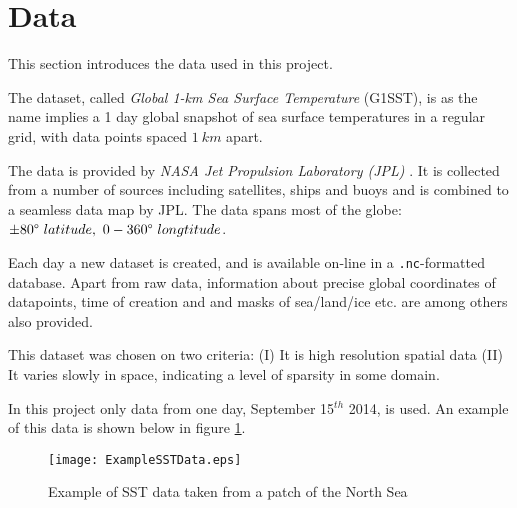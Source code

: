 \documentclass[Main]{subfiles}
\begin{document}
\section{Data} %
\label{sec:data}
	
	This section introduces the data used in this project.

	The dataset, called \emph{Global 1-km Sea Surface Temperature} (G1SST), is as the name implies a 1 day global snapshot of sea surface temperatures in a regular grid, with data points spaced $1\ km$ apart.

	The data is provided by \emph{NASA Jet Propulsion Laboratory (JPL)} \cite{G1SST:Online}.
	It is collected from a number of sources including satellites, ships and buoys and is combined to a seamless data map by JPL.
	The data spans most of the globe: $\pm 80\degree \ latitude,\ 0- 360\degree \ longtitude$.

	Each day a new dataset is created, and is available on-line in a \texttt{.nc}-formatted database.
	Apart from raw data, information about precise global coordinates of datapoints, time of creation and and masks of sea/land/ice etc. are among others also provided.

	This dataset was chosen on two criteria: (I) It is high resolution spatial data (II) It varies slowly in space, indicating a level of sparsity in some domain.

	In this project only data from one day, September 15$^{th}$ 2014, is used. An example of this data is shown below in figure \ref{fig:ExampleSSTData}.
	
	\begin{figure}[H]
		\centering 
		\texttt{[image: ExampleSSTData.eps]}
		\caption{Example of SST data taken from a patch of the North Sea}
		\label{fig:ExampleSSTData}
	\end{figure}

\end{document}

